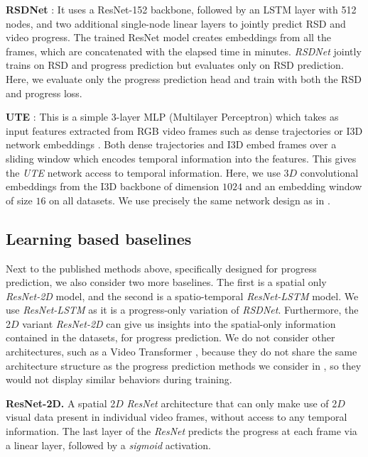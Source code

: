 \smallskip\noindent\textbf{RSDNet} \cite{twinanda2019}: It uses a ResNet-152 \cite{he2015} backbone, followed by an LSTM layer with 512 nodes, and two additional single-node linear layers to jointly predict RSD and video progress. 
The trained ResNet model creates embeddings from all the frames, which are concatenated with the elapsed time in minutes. 
\textsl{RSDNet} jointly trains on RSD and progress prediction but evaluates only on RSD prediction.
Here, we evaluate only the progress prediction head and train with both the RSD and progress loss.

\smallskip\noindent\textbf{UTE} \cite{kukleva2019}: This is a simple 3-layer MLP (Multilayer Perceptron) which takes as input features extracted from RGB video frames such as dense trajectories \cite{wang2013} or I3D network embeddings \cite{carreira2018}. 
Both dense trajectories and I3D embed frames over a sliding window which encodes temporal information into the features. 
This gives the \textsl{UTE} network access to temporal information.
Here, we use 3$D$ convolutional embeddings from the I3D backbone of dimension $1024$ and an embedding window of size $16$ on all datasets. 
We use precisely the same network design as in \cite{kukleva2019}.

\subsection{Learning based baselines}
Next to the published methods above, specifically designed for progress prediction, we also consider two more baselines. 
The first is a spatial only \textsl{ResNet-2D} model, and the second is a spatio-temporal \textsl{ResNet-LSTM} model. 
We use \textsl{ResNet-LSTM} as it is a progress-only variation of \textsl{RSDNet}. 
Furthermore, the 2$D$ variant \textsl{ResNet-2D} can give us insights into the spatial-only information contained in the datasets, for progress prediction.
We do not consider other architectures, such as a Video Transformer \cite{arnab2021}, because they do not share the same architecture structure as the progress prediction methods we consider in , so they would not display similar behaviors during training.


\smallskip\noindent\textbf{ResNet-2D.} A spatial 2$D$ \textsl{ResNet} \cite{he2015} architecture that can only make use of 2$D$ visual data present in individual video frames, without access to any temporal information. 
The last layer of the \textsl{ResNet} predicts the progress at each frame via a linear layer, followed by a \textsl{sigmoid} activation.

